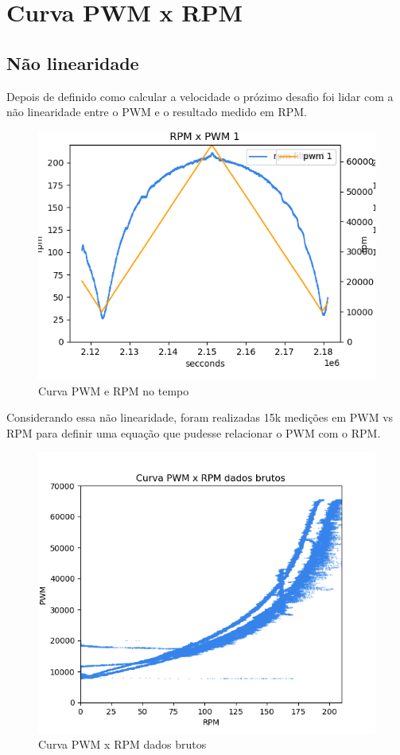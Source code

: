 
\chapter{Curva PWM x RPM}

\section{Não linearidade}

Depois de definido como calcular a velocidade o prózimo desafio foi lidar com a não linearidade entre o PWM e o resultado medido em RPM.

\begin{figure}[h]
	\centering
	\includegraphics{figures/pwm_x_rpm}
	\caption{Curva PWM e RPM no tempo}
	\label{lof}
\end{figure}

Considerando essa não linearidade, foram realizadas 15k medições em PWM vs RPM para definir uma equação que pudesse relacionar o PWM com o RPM.


\begin{figure}[h]
	\centering
	\includegraphics{figures/curva_pwm_x_rpm_dados_brutos}
	\caption{Curva PWM x RPM dados brutos}
	\label{lof}
\end{figure}


